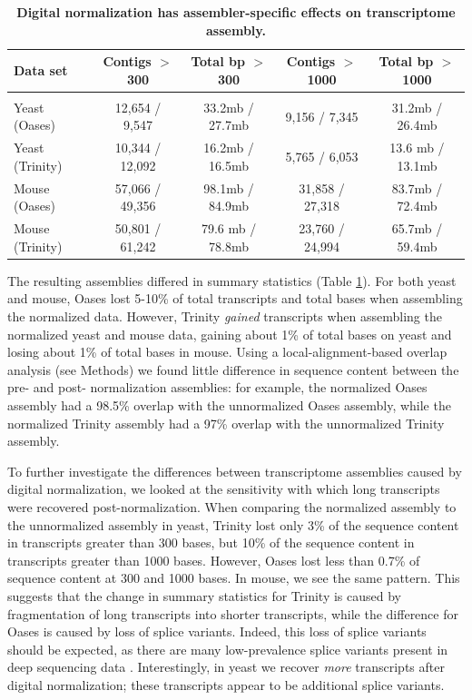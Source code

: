 \begin{table}[!ht]
\caption{
\bf{Digital normalization has assembler-specific effects on transcriptome
assembly.}}


\begin{tabular}{|l|c|c|c|c|}

Data set & Contigs $>$ 300 & Total bp $>$ 300 & Contigs $>$ 1000 & Total bp $>$ 1000 \\
\hline \\
Yeast (Oases) & 12,654 / 9,547 & 33.2mb / 27.7mb & 9,156 / 7,345 & 31.2mb / 26.4mb \\
Yeast (Trinity) & 10,344 / 12,092 & 16.2mb / 16.5mb & 5,765 / 6,053 & 13.6 mb / 13.1mb \\
Mouse (Oases) & 57,066 / 49,356 & 98.1mb / 84.9mb & 31,858 / 27,318 & 83.7mb / 72.4mb \\
Mouse (Trinity) & 50,801 / 61,242 & 79.6 mb / 78.8mb & 23,760 / 24,994 & 65.7mb / 59.4mb \\

\end{tabular}

\begin{flushleft}
\end{flushleft}
\label{tab:dntrans0}
\end{table}


The resulting assemblies differed in summary statistics (Table
\ref{tab:dntrans0}).  For both yeast and mouse, Oases lost 5-10\% of total
transcripts and total bases when assembling the normalized data.  However,
Trinity {\em gained} transcripts when assembling the normalized yeast and mouse
data, gaining about 1\% of total bases on yeast and losing about 1\% of total
bases in mouse.  Using a local-alignment-based overlap analysis (see Methods)
we found little difference in sequence content between the pre- and post-
normalization assemblies: for example, the normalized Oases assembly had a
98.5\% overlap with the unnormalized Oases assembly, while the normalized
Trinity assembly had a 97\% overlap with the unnormalized Trinity assembly.

To further investigate the differences between transcriptome assemblies caused
by digital normalization, we looked at the sensitivity with which long
transcripts were recovered post-normalization.  When comparing the normalized
assembly to the unnormalized assembly in yeast, Trinity lost only 3\% of the
sequence content in transcripts greater than 300 bases, but 10\% of the
sequence content in transcripts greater than 1000 bases.  However, Oases lost
less than 0.7\% of sequence content at 300 and 1000 bases.  In mouse, we see
the same pattern. This suggests that the change in summary statistics for
Trinity is caused by fragmentation of long transcripts into shorter
transcripts, while the difference for Oases is caused by loss of splice
variants.  Indeed, this loss of splice variants should be expected, as there
are many low-prevalence splice variants present in deep sequencing data
\cite{pubmed21151575}. Interestingly, in yeast we recover {\em more}
transcripts after digital normalization; these transcripts appear to be
additional splice variants.

